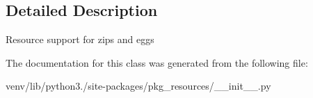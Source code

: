 \subsection{Detailed Description}
\begin{DoxyVerb}Resource support for zips and eggs\end{DoxyVerb}
 

The documentation for this class was generated from the following file\+:\begin{DoxyCompactItemize}
\item 
venv/lib/python3./site-\/packages/pkg\+\_\+resources/\+\_\+\+\_\+init\+\_\+\+\_\+.\+py\end{DoxyCompactItemize}
